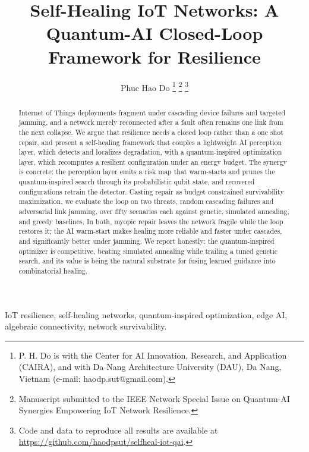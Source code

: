 \documentclass[journal]{IEEEtran}
\begin{document}
\title{Self-Healing IoT Networks: A Quantum-AI Closed-Loop Framework for Resilience}

\author{Phuc Hao Do%
\thanks{P. H. Do is with the Center for AI Innovation, Research, and Application (CAIRA), and with Da Nang Architecture University (DAU), Da Nang, Vietnam (e-mail: haodp.sut@gmail.com).}%
\thanks{Manuscript submitted to the IEEE Network Special Issue on Quantum-AI Synergies Empowering IoT Network Resilience.}%
\thanks{Code and data to reproduce all results are available at \url{https://github.com/haodpsut/selfheal-iot-qai}.}}

\maketitle

\begin{abstract}
Internet of Things deployments fragment under cascading device failures and targeted jamming, and a network merely reconnected after a fault often remains one link from the next collapse. We argue that resilience needs a closed loop rather than a one shot repair, and present a self-healing framework that couples a lightweight AI perception layer, which detects and localizes degradation, with a quantum-inspired optimization layer, which recomputes a resilient configuration under an energy budget. The synergy is concrete: the perception layer emits a risk map that warm-starts and prunes the quantum-inspired search through its probabilistic qubit state, and recovered configurations retrain the detector. Casting repair as budget constrained survivability maximization, we evaluate the loop on two threats, random cascading failures and adversarial link jamming, over fifty scenarios each against genetic, simulated annealing, and greedy baselines. In both, myopic repair leaves the network fragile while the loop restores it; the AI warm-start makes healing more reliable and faster under cascades, and significantly better under jamming. We report honestly: the quantum-inspired optimizer is competitive, beating simulated annealing while trailing a tuned genetic search, and its value is being the natural substrate for fusing learned guidance into combinatorial healing.
\end{abstract}

\begin{IEEEkeywords}
IoT resilience, self-healing networks, quantum-inspired optimization, edge AI, algebraic connectivity, network survivability.
\end{IEEEkeywords}
\end{document}
